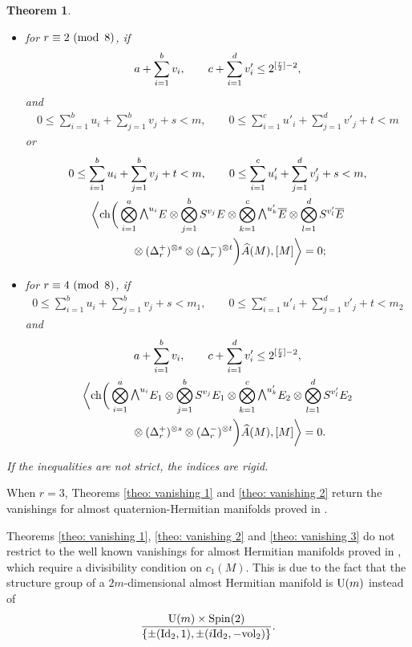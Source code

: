 \documentclass[pdftex]{sigma}
\newcommand{\A}{\mbox{$\widehat A$}}
\newcommand{\ext}{\raise1pt\hbox{$\textstyle\bigwedge$}}
\newcommand{\sym}{S}
\newcommand{\ch}{\mbox{\rm ch}}
\numberwithin{equation}{section}
\newtheorem{Theorem}{Theorem}[section]
\begin{document}
\begin{Theorem}
\begin{itemize}
 \item for $r\equiv 2 \,\,({\rm mod\,\,\,} 8)$, if
 \begin{gather*}
 a + \sum_{i=1}^b v_i,\qquad c + \sum_{i=1}^d v'_i \leq 2^{[{r\over 2}]-2},\end{gather*}
and
 \begin{gather*}
 0\leq \sum_{i=1}^b u_i+\sum_{j=1}^b v_j+s<m,\qquad 0 \leq \sum_{i=1}^c u'_i+\sum_{j=1}^d v'_j+t <m
 \end{gather*}
 or
 \begin{gather*}
 0\leq \sum_{i=1}^b u_i+\sum_{j=1}^b v_j+t<m,\qquad 0 \leq \sum_{i=1}^c u'_i+\sum_{j=1}^d v'_j+s <m, \\
 \bigg\langle \ch\bigg(\bigotimes_{i=1}^a\ext^{u_i}E\otimes\bigotimes_{j=1}^b\sym^{v_j} E
 \otimes\bigotimes_{k=1}^c \ext^{u'_k}\overline{E}\otimes\bigotimes_{l=1}^d\sym^{v'_l} \overline{E} \\
 \qquad{} \otimes (\Delta_r^+)^{\otimes s}\otimes (\Delta_r^-)^{\otimes t} \bigg)
 \A(M),[M]\bigg\rangle =0;\end{gather*}

 \item for $r\equiv 4 \,\,({\rm mod\,\,\,} 8)$, if
 \begin{gather*}
 0\leq \sum_{i=1}^b u_i+\sum_{j=1}^b v_j+s<m_1,\qquad 0\leq \sum_{i=1}^c u'_i+\sum_{j=1}^d v'_j+t <m_2
 \end{gather*}
 and
 \begin{gather*}
 a + \sum_{i=1}^b v_i,\qquad c + \sum_{i=1}^d v'_i\leq 2^{[{r\over 2}]-2},
 \\
 \bigg\langle \ch\bigg(\bigotimes_{i=1}^a\ext^{u_i}E_1\otimes\bigotimes_{j=1}^b\sym^{v_j} E_1 \otimes
 \bigotimes_{k=1}^c\ext^{u'_k}E_2\otimes\bigotimes_{l=1}^d\sym^{v'_l} E_2 \\
 \qquad{} \otimes(\Delta_r^+)^{\otimes s}\otimes(\Delta_r^-)^{\otimes t} \bigg) \A(M),[M]\bigg\rangle =0.\end{gather*}
 \end{itemize}
 If the inequalities are not strict, the indices are rigid.
 \end{Theorem}

\begin{Remark}When $r=3$, Theorems \ref{theo: vanishing 1} and \ref{theo: vanishing 2} return the vanishings for almost quaternion-Hermitian manifolds proved in \cite{Herrera-Herrera}.
\end{Remark}

\begin{Remark} Theorems \ref{theo: vanishing 1}, \ref{theo: vanishing 2} and \ref{theo: vanishing 3} do not restrict to the well known vanishings for almost Hermitian manifolds proved in \cite{Hattori}, which require a divisibility condition on $c_1(M)$. This is due to the fact that the structure group of a $2m$-dimensional almost Hermitian manifold is ${\rm U}(m)$ instead of
\begin{gather*}{{\rm U}(m)\times {\rm Spin}(2)\over \{\pm({\rm Id}_2,1),\pm(i{\rm Id}_2,-{\rm vol}_2)\}}.\end{gather*}
\end{Remark}
\end{document}
